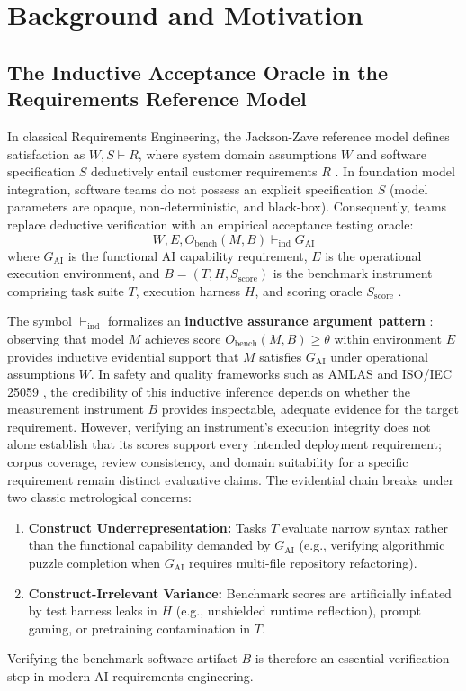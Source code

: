 \documentclass[runningheads]{llncs}
\begin{document}
\section{Background and Motivation}
\label{sec:background}

\subsection{The Inductive Acceptance Oracle in the Requirements Reference Model}
In classical Requirements Engineering, the Jackson-Zave reference model defines satisfaction as $W, S \vdash R$, where system domain assumptions $W$ and software specification $S$ deductively entail customer requirements $R$ \cite{zave_jackson_1997,habiba_re4ai_maturity_2024}. In foundation model integration, software teams do not possess an explicit specification $S$ (model parameters are opaque, non-deterministic, and black-box). Consequently, teams replace deductive verification with an empirical acceptance testing oracle:
\begin{equation}
\label{eq:jz_inductive}
W, E, O_{\text{bench}}(M, B) \vdash_{\text{ind}} G_{\text{AI}}
\end{equation}
where $G_{\text{AI}}$ is the functional AI capability requirement, $E$ is the operational execution environment, and $B = (T, H, S_{\text{score}})$ is the benchmark instrument comprising task suite $T$, execution harness $H$, and scoring oracle $S_{\text{score}}$ \cite{bean_measuring_what_matters}.

The symbol $\vdash_{\text{ind}}$ formalizes an \textbf{inductive assurance argument pattern} \cite{hawkins_amlas_2021}: observing that model $M$ achieves score $O_{\text{bench}}(M, B) \ge \theta$ within environment $E$ provides inductive evidential support that $M$ satisfies $G_{\text{AI}}$ under operational assumptions $W$. In safety and quality frameworks such as AMLAS and ISO/IEC 25059 \cite{hawkins_amlas_2021,iso_iec_25059_2023}, the credibility of this inductive inference depends on whether the measurement instrument $B$ provides inspectable, adequate evidence for the target requirement. However, verifying an instrument's execution integrity does not alone establish that its scores support every intended deployment requirement; corpus coverage, review consistency, and domain suitability for a specific requirement remain distinct evaluative claims. The evidential chain breaks under two classic metrological concerns:
\begin{enumerate}[leftmargin=*]
    \item \textbf{Construct Underrepresentation:} Tasks $T$ evaluate narrow syntax rather than the functional capability demanded by $G_{\text{AI}}$ (e.g., verifying algorithmic puzzle completion when $G_{\text{AI}}$ requires multi-file repository refactoring).
    \item \textbf{Construct-Irrelevant Variance:} Benchmark scores are artificially inflated by test harness leaks in $H$ (e.g., unshielded runtime reflection), prompt gaming, or pretraining contamination in $T$.
\end{enumerate}
Verifying the benchmark software artifact $B$ is therefore an essential verification step in modern AI requirements engineering.
\end{document}
